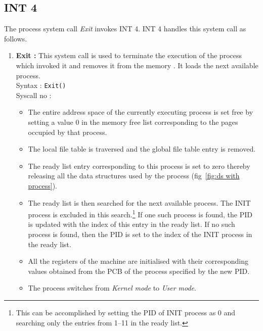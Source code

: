 \subsection{INT 4}
The process system call \textit{Exit} invokes INT 4. INT 4 handles this system call as follows.
\begin{enumerate}
	\item  \textbf{Exit :}  This system call is used to terminate the execution of the process which invoked it and removes it from the memory . It loads the next available process.\\
	Syntax :  \texttt{Exit()}  \\
	Syscall no : 
	\begin{itemize}
		\item The entire address space of the currently executing process is set free by setting a value 0 in the memory free list corresponding to the pages occupied by that process.
		
		\item The local file table is traversed and the global file table entry is removed.
		
		\item The ready list entry corresponding to this process is set to zero thereby releasing all the data structures used by the process (fig~\ref{fig:ds with process}).
		
		\item The ready list is then searched for the next available process. The INIT process is excluded in this search.\footnote{This can be accomplished by setting the PID of INIT process as 0 and searching only the entries from 1--11 in the ready list.} If one such process is found, the PID is updated with the index of this entry in the ready list. If no such process is found, then the PID is set to the index of the INIT process in the ready list.
		
		\item All the registers of the machine are initialised with their corresponding values obtained from the PCB of the process specified by the new PID.
		
		\item The process switches from \textit{Kernel mode} to \textit{User mode}.
	\end{itemize}
\end{enumerate}

